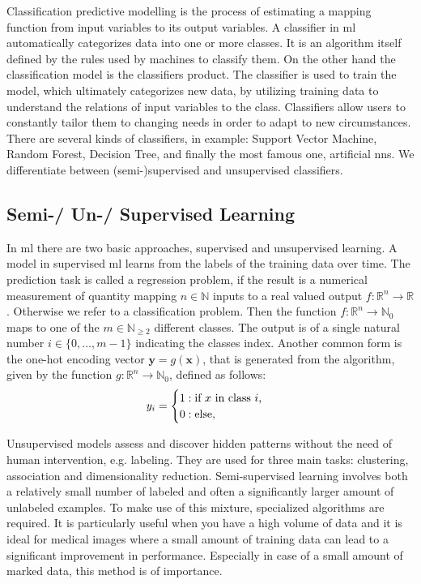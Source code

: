 Classification predictive modelling is the process of estimating a mapping function from input variables to its output variables. A classifier in \acrshort{ml} automatically categorizes data into one or more classes. It is an algorithm itself defined by the rules used by machines to classify them. On the other hand the classification model is the classifiers product. The classifier is used to train the model, which ultimately categorizes new data, by utilizing training data to understand the relations of input variables to the class. Classifiers allow users to constantly tailor them to changing needs in order to adapt to new circumstances. There are several kinds of classifiers, in example: Support Vector Machine, Random Forest, Decision Tree, and finally the most famous one, artificial \acrshort{nn}s. We differentiate between (semi-)supervised and unsupervised classifiers.

\subsection{Semi-/ Un-/ Supervised Learning}

In \acrshort{ml} there are two basic approaches, supervised and unsupervised learning. A model in supervised \acrshort{ml} learns from the labels of the training data over time. The prediction task is called a \gls{regression} problem, if the result is a numerical measurement of quantity mapping \( n \in \mathbb{N} \) inputs to a real valued output \( f: \mathbb{R}^{n} \to \mathbb{R} \). Otherwise we refer to a classification problem. Then the function \( f: \mathbb{R}^{n} \to \mathbb{N}_{0} \) maps to one of the \( m \in \mathbb{N}_{\geq 2} \) different classes. The output is of a single natural number \( i \in \{ 0, \dots, m-1 \} \) indicating the classes index. Another common form is the one-hot encoding vector \( \mathbf{y} = g(\mathbf{x}) \), that is generated from the algorithm, given by the function \( g: \mathbb{R}^{n} \to \mathbb{N}_{0} \), defined as follows:
\begin{equation}
    y_i = 
    \begin{cases}
        1: \textnormal{if } x \textnormal{ in class } i \textnormal{,} \\
        0: \textnormal{else,}
    \end{cases}
\label{eq:onehotmatrix}
\end{equation}

Unsupervised models assess and discover hidden patterns without the need of human intervention, e.g. labeling. They are used for three main tasks: clustering, association and dimensionality reduction. Semi-supervised learning involves both a relatively small number of labeled and often a significantly larger amount of unlabeled examples. To make use of this mixture, specialized algorithms are required. It is particularly useful when you have a high volume of data and it is ideal for medical images where a small amount of training data can lead to a significant improvement in performance. Especially in case of a small amount of marked data, this method is of importance.

